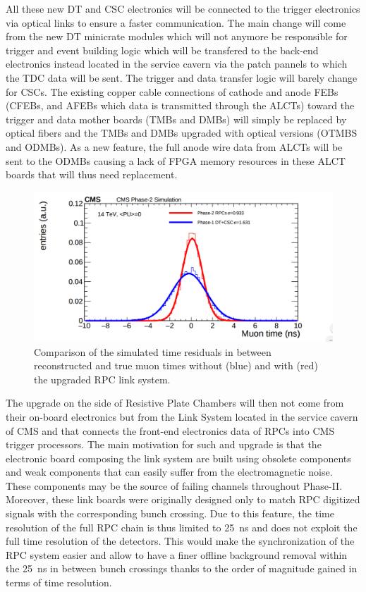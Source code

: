 	All these new DT and CSC electronics will be connected to the trigger electronics via optical links to ensure a faster communication. The main change will come from the new DT minicrate modules which will not anymore be responsible for trigger and event building logic which will be transfered to the back-end electronics instead located in the service cavern via the patch pannels to which the \acf{TDC} data will be sent. The trigger and data transfer logic will barely change for CSCs. The existing copper cable connections of cathode and anode FEBs (CFEBs, and AFEBs which data is transmitted through the ALCTs) toward the trigger and data mother boards (TMBs and DMBs) will simply be replaced by optical fibers and the TMBs and DMBs upgraded with optical versions (OTMBS and ODMBs). As a new feature, the full anode wire data from ALCTs will be sent to the ODMBs causing a lack of FPGA memory resources in these ALCT boards that will thus need replacement.
	
	\begin{figure}[H]
		\centering
		\includegraphics[width=\plotwidth]{fig/chapt3/RPC-ugrade-LS.png}
		\caption{\label{fig:RPC-time} Comparison of the simulated time residuals in between reconstructed and true muon times without (blue) and with (red) the upgraded RPC link system.}
	\end{figure}
	
	The upgrade on the side of Resistive Plate Chambers will then not come from their on-board electronics but from the Link System located in the service cavern of CMS and that connects the front-end electronics data of RPCs into CMS trigger processors. The main motivation for such and upgrade is that the electronic board composing the link system are built using obsolete components and weak components that can easily suffer from the electromagnetic noise. These components may be the source of failing channels throughout Phase-II. Moreover, these link boards were originally designed only to match RPC digitized signals with the corresponding bunch crossing. Due to this feature, the time resolution of the full RPC chain is thus limited to \SI{25}{ns} and does not exploit the full time resolution of the detectors. This would make the synchronization of the RPC system easier and allow to have a finer offline background removal within the \SI{25}{ns} in between bunch crossings thanks to the order of magnitude gained in terms of time resolution.
	
